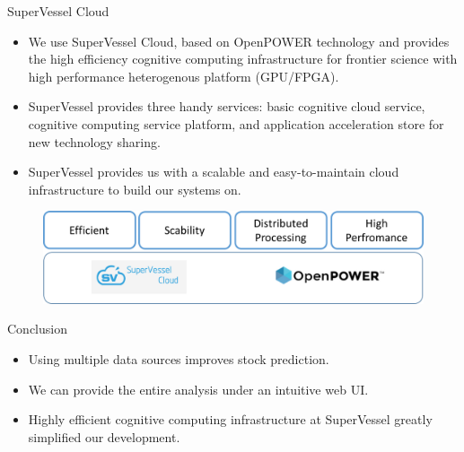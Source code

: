 \documentclass[final,hyperref={pdfpagelabels=false}]{beamer}
\begin{document}
\begin{frame}[t]
\begin{columns}[t]
\begin{column}{.445\textwidth}
\begin{block}{SuperVessel Cloud}
\begin{itemize}
\item We use SuperVessel Cloud, based on OpenPOWER technology and provides the high efficiency cognitive computing infrastructure for frontier science with high performance heterogenous platform (GPU/FPGA).

\item SuperVessel provides three handy services: basic cognitive cloud service, cognitive computing service platform, and application acceleration store for new technology sharing. 

\item SuperVessel provides us with a scalable and easy-to-maintain cloud infrastructure to build our systems on. 
\end{itemize}



 \begin{figure}
		\includegraphics[width=0.7\linewidth]{openpower.png}
	\end{figure}
\end{block}


\begin{block}{Conclusion}

\begin{itemize}
\item Using multiple data sources improves stock prediction. 
\item We can provide the entire analysis under an intuitive web UI.
\item Highly efficient cognitive computing infrastructure at SuperVessel greatly simplified our development.
\end{itemize}

\end{block}



\end{column}
\end{columns}
\end{frame}
\end{document}
